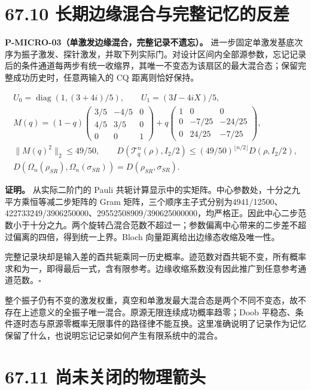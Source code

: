 \documentclass[
  11pt,
  oneside]{book}
\begin{document}
\section{67.10 长期边缘混合与完整记忆的反差}

\protect\hypertarget{p-micro-03}{}{}

\textbf{P-MICRO-03（单激发边缘混合，完整记录不遗忘）。}
进一步固定单激发基底次序为振子激发、探针激发，并取下列实际门。对设计区间内全部源参数，忘记记录后的条件通道每两步有统一收缩界，其唯一不变态为该扇区的最大混合态；保留完整成功历史时，任意两输入的
CQ 距离则恰好保持。

\[
\begin{gathered}
U_0=\operatorname{diag}(1,(3+4i)/5),\qquad U_1=(3I-4iX)/5,\\
M(q)=(1-q)
\begin{pmatrix}3/5&-4/5&0\\4/5&3/5&0\\0&0&1\end{pmatrix}
+q\begin{pmatrix}1&0&0\\0&-7/25&-24/25\\0&24/25&-7/25\end{pmatrix},\\
\|M(q)^2\|_2\le49/50,\qquad
D(\mathcal T_q^n(\rho),I_2/2)
\le(49/50)^{\lfloor n/2\rfloor}D(\rho,I_2/2),\\
D(\Omega_n(\rho_{SR}),\Omega_n(\sigma_{SR}))
=D(\rho_{SR},\sigma_{SR}).
\end{gathered}
\]

\textbf{证明。} 从实际二阶门的 Pauli
共轭计算显示中的实矩阵。中心参数处，十分之九平方乘恒等减二步矩阵的 Gram
矩阵，三个顺序主子式分别为4941/12500、422733249/3906250000、29552508909/390625000000，均严格正。因此中心二步范数小于十分之九。两个旋转凸混合范数不超过一；参数偏离中心带来的二步差不超过偏离的四倍，得到统一上界。Bloch
向量距离给出边缘态收缩及唯一性。

完整记录块却是输入差的酉共轭乘同一历史概率。迹范数对酉共轭不变，所有概率求和为一，即得最后一式，含有限参考。边缘收缩系数没有因此推广到任意参考通道范数。\(\square\)

整个振子仍有不变的激发权重，真空和单激发最大混合态是两个不同不变态，故不存在上述意义的全振子唯一混合。原源无限连续成功概率趋零；Doob
平稳态、条件逐时态与原源零概率无限事件的路径律不能互换。这里准确说明了记录作为记忆保留了什么，也说明忘记记录如何产生有限系统中的混合。

\section{67.11 尚未关闭的物理箭头}
\end{document}
